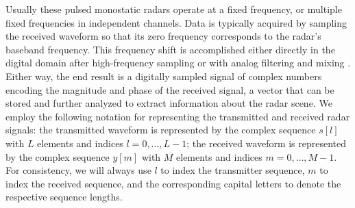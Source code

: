 Usually these pulsed monostatic radars operate at a fixed frequency, or multiple fixed frequencies in independent channels. Data is typically acquired by sampling the received waveform so that its zero frequency corresponds to the radar's baseband frequency. This frequency shift is accomplished either directly in the digital domain after high-frequency sampling or with analog filtering and mixing \autocite{Ric05, Sko08}. Either way, the end result is a digitally sampled signal of complex numbers encoding the magnitude and phase of the received signal, a vector that can be stored and further analyzed to extract information about the radar scene. We employ the following notation for representing the transmitted and received radar signals: the transmitted waveform is represented by the complex sequence $s[l]$ with $L$ elements and indices $l=0,\dotsc,L-1$; the received waveform is represented by the complex sequence $y[m]$ with $M$ elements and indices $m=0,\dotsc,M-1$. For consistency, we will always use $l$ to index the transmitter sequence, $m$ to index the received sequence, and the corresponding capital letters to denote the respective sequence lengths.

